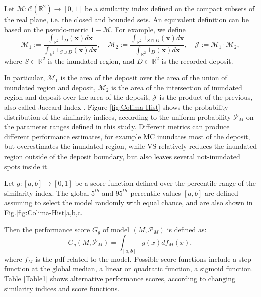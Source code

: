 \documentclass{article}
\begin{document}
Let $\mathcal M:\mathcal C(\mathbb R^2)\rightarrow[0,1]$ be a similarity index defined on the compact subsets of the real plane, i.e. the closed and bounded sets. An equivalent definition can be based on the pseudo-metric $1-\mathcal M$. For example, we define
$$\mathcal M_1:=\frac{\int_{\mathbb R^2} 1_D(\textbf{x})d\textbf{x}}{\int_{\mathbb R^2} 1_{S \cup D}(\textbf{x}) d\textbf{x}},\quad \mathcal M_2:=\frac{\int_{\mathbb R^2} 1_{S \cap D}(\textbf{x}) d\textbf{x}}{\int_{\mathbb R^2} 1_D(\textbf{x})d\textbf{x}}, \quad \mathcal J:=\mathcal M_1\cdot \mathcal M_2,$$
where $S\subset \mathbb R^2$ is the inundated region, and $D\subset \mathbb R^2$ is the recorded deposit.

In particular, $\mathcal M_1$ is the area of the deposit over the area of the union of inundated region and deposit, $\mathcal M_2$ is the area of the intersection of inundated region and deposit over the area of the deposit, $\mathcal J$ is the product of the previous, also called Jaccard Index \citep{Jaccard1901}. Figure \ref{fig:Colima-Hist} shows the probability distribution of the similarity indices, according to the uniform probability $\mathcal P_M$ on the parameter ranges defined in this study. Different metrics can produce different performance estimates, for example MC inundates most of the deposit, but overestimates the inundated region, while VS relatively reduces the inundated region outside of the deposit boundary, but also leaves several not-inundated spots inside it.

Let $g:[a,b]\rightarrow[0,1]$ be a score function defined over the percentile range of the similarity index. The global $5^{th}$ and $95^{th}$ percentile values $[a,b]$ are defined assuming to select the model randomly with equal chance, and are also shown in Fig.\ref{fig:Colima-Hist}a,b,c.

Then the performance score $G_g$ of model $\left(M, \mathcal P_M\right)$ is defined as:
$$G_g\left(M, \mathcal P_M\right)=\int_{[a,b]} g(x) df_M(x),$$
where $f_M$ is the pdf related to the model. Possible score functions include a step function at the global median, a linear or quadratic function, a sigmoid function. Table \ref{Table1} shows alternative performance scores, according to changing similarity indices and score functions.
\end{document}
